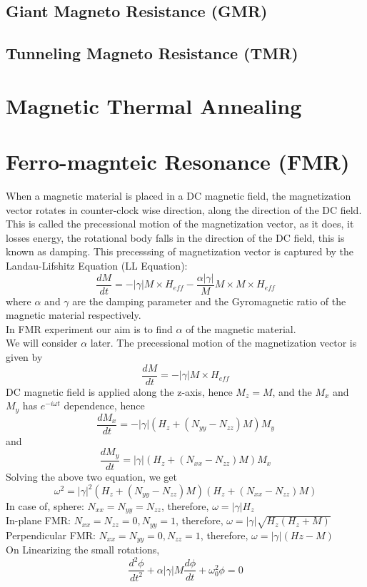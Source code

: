 \subsection{Giant Magneto Resistance (GMR)}
\subsection{Tunneling Magneto Resistance (TMR)}

\section{Magnetic Thermal Annealing}
\section{Ferro-magnteic Resonance (FMR)}
When a magnetic material is placed in a DC magnetic field, the magnetization vector rotates in counter-clock wise direction, along the direction of the DC field. This is called the precessional motion of the magnetization vector, as it does, it losses energy, the rotational body falls in the direction of the DC field, this is known as damping. This precesssing of magnetization vector is captured by the   Landau-Lifshitz Equation (LL Equation):
\[\frac{dM}{dt}=-|\gamma|M\times H_{eff} - \frac{\alpha |\gamma|}{M}M\times M\times H_{eff}\]
where $\alpha$ and $\gamma$ are the damping parameter and the Gyromagnetic ratio of the magnetic material respectively.\\
In FMR experiment our aim is to find $\alpha$ of the magnetic material.\\
We will consider $\alpha$ later. The precessional motion of the magnetization vector is given by 
\[\frac{dM}{dt}=-|\gamma|M\times H_{eff}\]
DC magnetic field is applied along the z-axis, hence $M_z=M$, and the $M_x$ and $M_y$ has $e^{-i\omega t}$ dependence, hence
\[\frac{dM_x}{dt}=-|\gamma|(H_z + (N_{yy}-N_{zz})M)M_y\]
and
\[\frac{dM_y}{dt}=|\gamma|(H_z + (N_{xx}-N_{zz})M)M_x\]
Solving the above two equation, we get
\[\omega^2=|\gamma|^2(H_z + (N_{yy}-N_{zz})M)(H_z+(N_{xx}-N_{zz})M)\]
In case of, sphere: $N_{xx}=N_{yy}=N_{zz}$, therefore, $\omega =|\gamma|H_z$\\
In-plane FMR: $N_{xx}=N_{zz}=0, N_{yy}=1$, therefore, $\omega =|\gamma|\sqrt{H_z(H_z+M)}$\\
Perpendicular FMR:  $N_{xx}=N_{yy}=0, N_{zz}=1$, therefore, $\omega =|\gamma|(Hz-M)$\\
On Linearizing the small rotations,
\[\frac{d^2\phi}{dt^2}+\alpha|\gamma|M\frac{d\phi}{dt}+\omega_0^2\phi=0\]
